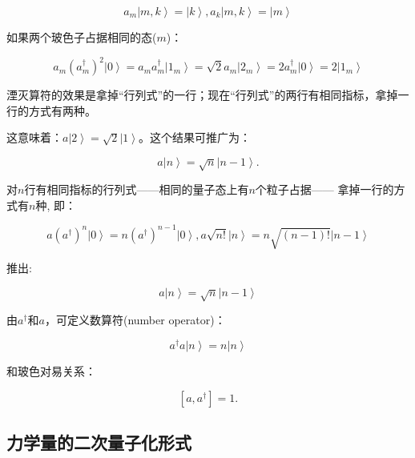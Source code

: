 \begin{equation*}
a_m \left| {m,k} \right\rangle = \left| k \right\rangle , a_k \left|
{m,k} \right\rangle = \left| m \right\rangle
\end{equation*}


如果两个玻色子占据相同的态($m$)：

\begin{equation*}
a_m (a_m^{\dag})^2 \left| 0 \right\rangle = a_m a_m^{\dag} \left|
{1_m} \right\rangle = \sqrt 2 a_m  \left| {2_m} \right\rangle = 2
a_m^{\dag} \left| 0 \right\rangle = 2 \left| {1_m} \right\rangle
\end{equation*}


湮灭算符的效果是拿掉“行列式”的一行；现在“行列式”的两行有相同指标，拿掉一行的方式有两种。

这意味着：$a \left| 2 \right\rangle = \sqrt 2 \left| 1 \right\rangle
$。这个结果可推广为：

\begin{equation*}
a \left| n \right\rangle = \sqrt n \left| {n-1} \right\rangle .
\end{equation*}

对$n$行有相同指标的行列式——相同的量子态上有$n$个粒子占据——
拿掉一行的方式有$n$种, 即：

\begin{equation*}
a (a^{\dag})^n \left| 0 \right\rangle = n (a^{\dag})^{n-1} \left| 0
\right\rangle , a \sqrt {n!} \left| n \right\rangle  = n \sqrt
{(n-1)!} \left| {n-1} \right\rangle
\end{equation*}


推出:


\begin{equation}\label{boson recursion minus}
a \left| n \right\rangle = \sqrt n \left| {n-1} \right\rangle
\end{equation}


由$a^\dagger$和$a$，可定义数算符(number operator)：

\begin{equation}\label{Boson number operator}
a^{\dag} a \left| n \right\rangle = n \left| n \right\rangle
\end{equation}

和玻色对易关系：

\begin{equation}\label{Boson commutation}
[a, a^{\dagger}] =1 .
\end{equation}


\subsection{力学量的二次量子化形式}


